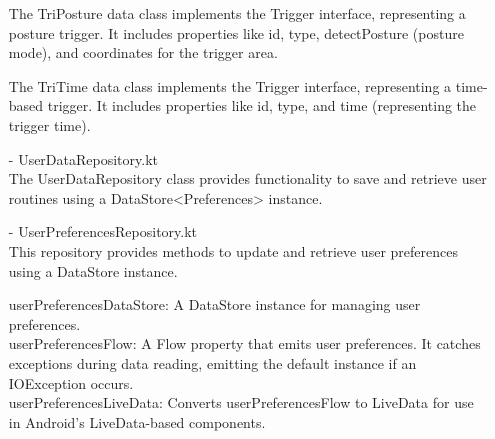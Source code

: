\begin{enumerate}
            The TriPosture data class implements the Trigger interface, representing a posture trigger. It includes properties like id, type, detectPosture (posture mode), and coordinates for the trigger area.

            The TriTime data class implements the Trigger interface, representing a time-based trigger. It includes properties like id, type, and time (representing the trigger time).\\
      \item[-] UserDataRepository.kt\\
            The UserDataRepository class provides functionality to save and retrieve user routines using a DataStore<Preferences> instance.\\
      \item[-] UserPreferencesRepository.kt\\
            This repository provides methods to update and retrieve user preferences using a DataStore instance.

            userPreferencesDataStore: A DataStore instance for managing user preferences.\\

            userPreferencesFlow: A Flow property that emits user preferences. It catches exceptions during data reading, emitting the default instance if an IOException occurs.\\
            userPreferencesLiveData: Converts userPreferencesFlow to LiveData for use in Android's LiveData-based components.\\


\end{enumerate}
